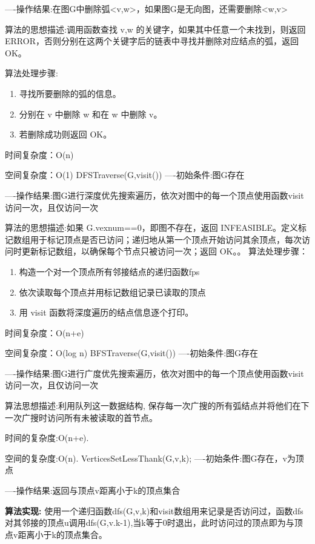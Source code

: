 \documentclass[supercite]{Experimental_Report}
\theoremstyle{definition}
\begin{document}
----操作结果:在图G中删除弧<v,w>，如果图G是无向图，还需要删除<w,v>

算法的思想描述:调用函数查找 v,w 的关键字，如果其中任意一个未找到，则返回 ERROR，否则分别在这两个关键字后的链表中寻找并删除对应结点的弧，返回 OK。	

算法处理步骤:
\begin{enumerate}
	\renewcommand{\labelenumi}{\theenumi)}
	\item 寻找所要删除的弧的信息。
	\item 分别在 v 中删除 w 和在 w 中删除 v。
	\item 若删除成功则返回 OK。
\end{enumerate}

时间复杂度：O(n)

空间复杂度：O(1)
DFSTraverse(G,visit())
----初始条件:图G存在

----操作结果:图G进行深度优先搜索遍历，依次对图中的每一个顶点使用函数visit访问一次，且仅访问一次

算法的思想描述:如果 G.vexnum==0，即图不存在，返回 INFEASIBLE。定义标记数组用于标记顶点是否已访问；递归地从第一个顶点开始访问其余顶点，每次访问时更新标记数组，以确保每个节点只被访问一次；返回 OK。。
算法处理步骤：
\begin{enumerate}
	\renewcommand{\labelenumi}{\theenumi)}
	\item  构造一个对一个顶点所有邻接结点的递归函数fps
	\item  依次读取每个顶点并用标记数组记录已读取的顶点
	\item  用 visit 函数将深度遍历的结点信息逐个打印。
\end{enumerate}

时间复杂度：O(n+e)

空间复杂度：O(log n)
BFSTraverse(G,visit())
----初始条件:图G存在

----操作结果:图G进行广度优先搜索遍历，依次对图中的每一个顶点使用函数visit访问一次，且仅访问一次

算法思想描述:利用队列这一数据结构, 保存每一次广搜的所有弧结点并将他们在下一次广搜时访问所有未被读取的首节点。

时间的复杂度:O(n+e).

空间的复杂度:O(n).
VerticesSetLessThank(G,v,k);
----初始条件:图G存在，v为顶点

----操作结果:返回与顶点v距离小于k的顶点集合

\textbf{算法实现: }使用一个递归函数dfs(G,v,k)和visit数组用来记录是否访问过，函数dfs对其邻接的顶点u调用dfs(G,v.k-1),当k等于0时退出，此时访问过的顶点即为与顶点v距离小于k的顶点集合。
\end{document}

